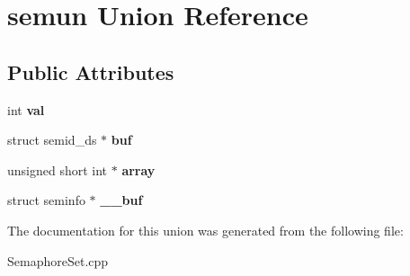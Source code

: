 \hypertarget{unionsemun}{}\section{semun Union Reference}
\label{unionsemun}
\subsection*{Public Attributes}
\begin{DoxyCompactItemize}
\item 
int {\bfseries val}\hypertarget{unionsemun_ac6121ecb6d04a024e07e12bd71b94031}{}\label{unionsemun_ac6121ecb6d04a024e07e12bd71b94031}

\item 
struct semid\+\_\+ds $\ast$ {\bfseries buf}\hypertarget{unionsemun_ac6b6428d07d4147fd2cc698b53555bed}{}\label{unionsemun_ac6b6428d07d4147fd2cc698b53555bed}

\item 
unsigned short int $\ast$ {\bfseries array}\hypertarget{unionsemun_ab6029cc01ffece038873310b5adede70}{}\label{unionsemun_ab6029cc01ffece038873310b5adede70}

\item 
struct seminfo $\ast$ {\bfseries \+\_\+\+\_\+buf}\hypertarget{unionsemun_aa0ac6a1a9174a4ae355bc367e7e64780}{}\label{unionsemun_aa0ac6a1a9174a4ae355bc367e7e64780}

\end{DoxyCompactItemize}


The documentation for this union was generated from the following file\+:\begin{DoxyCompactItemize}
\item 
Semaphore\+Set.\+cpp\end{DoxyCompactItemize}
